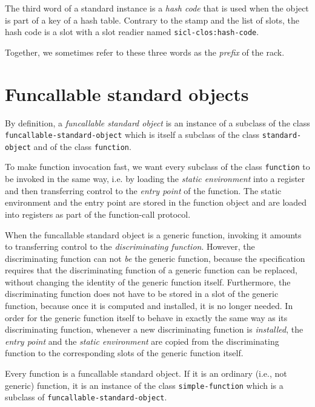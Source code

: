 The third word of a standard instance is a \emph{hash code} that is
used when the object is part of a key of a hash table.  Contrary to
the stamp and the list of slots, the hash code is a slot with a slot
readier named \texttt{sicl-clos:hash-code}.

Together, we sometimes refer to these three words as the \emph{prefix}
of the rack.

\section{Funcallable standard objects}
\label{sec-data-representation-funcallable-standard-objects}

By definition, a \emph{funcallable standard object} is an instance of
a subclass of the class \texttt{funcallable-standard-object} which is
itself a subclass of the class \texttt{standard-object} and of the
class \texttt{function}. 

To make function invocation fast, we want every subclass of the class
\texttt{function} to be invoked in the same way, i.e. by loading the
\emph{static environment} into a register and then transferring
control to the \emph{entry point} of the function. The static
environment and the entry point are stored in the function object
and are loaded into registers as part of the function-call protocol.

When the funcallable standard object is a generic function, invoking
it amounts to transferring control to the \emph{discriminating
  function}.  However, the discriminating function can not \emph{be}
the generic function, because the \clos{} specification requires that
the discriminating function of a generic function can be replaced,
without changing the identity of the generic function itself.
Furthermore, the discriminating function does not have to be stored in
a slot of the generic function, because once it is computed and
installed, it is no longer needed.  In order for the generic function
itself to behave in exactly the same way as its discriminating
function, whenever a new discriminating function is \emph{installed},
the \emph{entry point} and the \emph{static environment} are copied
from the discriminating function to the corresponding slots of the
generic function itself.

Every \sysname{} function is a funcallable standard object.  If it is
an ordinary (i.e., not generic) function, it is an instance of the
class \texttt{simple-function} which is a subclass of
\texttt{funcallable-standard-object}.

